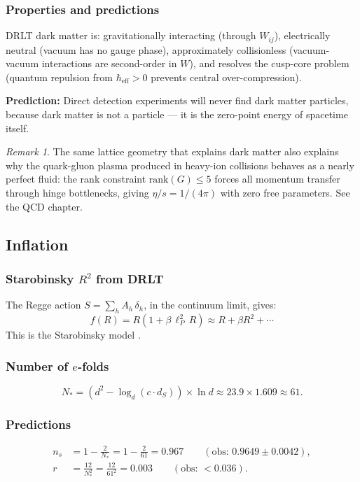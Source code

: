\documentclass[12pt]{article}
\theoremstyle{remark}
\newtheorem{remark}[theorem]{Remark}
\theoremstyle{definition}
\begin{document}
\subsubsection{Properties and predictions}

DRLT dark matter is: gravitationally interacting (through $W_{ij}$), electrically neutral (vacuum has no gauge phase), approximately collisionless (vacuum-vacuum interactions are second-order in $W$), and resolves the cusp-core problem (quantum repulsion from $\hbar_\text{eff} > 0$ prevents central over-compression).

\textbf{Prediction:} Direct detection experiments will never find dark matter particles, because dark matter is not a particle --- it is the zero-point energy of spacetime itself.

\begin{remark}
The same lattice geometry that explains dark matter also explains why the quark-gluon plasma produced in heavy-ion collisions behaves as a nearly perfect fluid: the rank constraint $\text{rank}(G) \leq 5$ forces all momentum transfer through hinge bottlenecks, giving $\eta/s = 1/(4\pi)$ with zero free parameters. See the QCD chapter.
\end{remark}

\subsection{Inflation}

\subsubsection{Starobinsky $R^2$ from DRLT}

The Regge action $S = \sum_h A_h\,\delta_h$, in the continuum limit, gives:
\begin{equation}
f(R) = R(1 + \beta\,\ell_P^2\,R) \approx R + \beta R^2 + \cdots
\end{equation}
This is the Starobinsky model \cite{Starobinsky}.

\subsubsection{Number of $e$-folds}

\begin{equation}
N_* = (d^2 - \log_d(c \cdot d_S)) \times \ln d \approx 23.9 \times 1.609 \approx 61.
\end{equation}

\subsubsection{Predictions}
\begin{align}
n_s &= 1 - \frac{2}{N_*} = 1 - \frac{2}{61} = 0.967 \qquad (\text{obs: } 0.9649 \pm 0.0042), \\
r &= \frac{12}{N_*^2} = \frac{12}{61^2} = 0.003 \qquad (\text{obs: } < 0.036).
\end{align}
\end{document}
